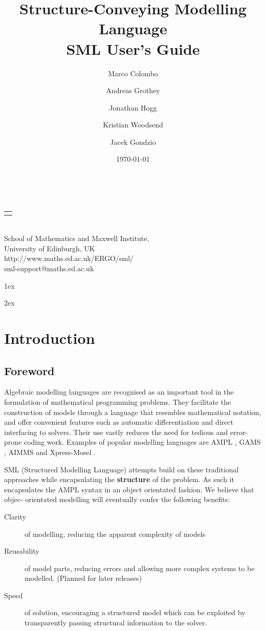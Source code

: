\documentclass[10pt,a4paper]{report}
\makeatletter
\renewcommand{\maketitle}{
\thispagestyle{empty}
\begin{center}
\vspace*{4cm}
{\rmfamily\Huge \@title}\\
\vspace{2cm}
{\rmfamily\Large
\begin{tabular}[t]{c}%
        \@author
      \end{tabular}
}\\
\vspace{1cm}
{\rmfamily\Large School of Mathematics and Maxwell Institute, \\[0.5ex]
University of Edinburgh, UK} \\[5ex]
{\ttfamily\Large http://www.maths.ed.ac.uk/ERGO/sml/ \\[0.5ex]
                 sml-support@maths.ed.ac.uk}\\
\vspace{2cm}
{\rmfamily \Large \@date}
\end{center}
\clearpage
}
\makeatother
\begin{document}
\title{Structure-Conveying Modelling Language \\[1em]
   \textbf{SML User's Guide}}
\author{Marco Colombo
  \and Andreas Grothey
  \and Jonathan Hogg
  \and Kristian Woodsend
  \and Jacek Gondzio}
\date{\today}

\maketitle

\parindent 0pt
\parskip   1ex

\tableofcontents

\parskip   2ex

\chapter*{Introduction}


\section*{Foreword}
\label{sec:Intro}

Algebraic modelling languages are recognised as an important tool in the
formulation of mathematical programming problems. They facilitate the
construction of models through a language that resembles mathematical
notation, and offer convenient features such as automatic differentiation and
direct interfacing to solvers. Their use vastly reduces the need for tedious
and error-prone coding work. Examples of popular modelling languages
are AMPL \cite{mybib:AMPL}, GAMS \cite{mybib:GAMS}, AIMMS \cite{mybib:AIMMS}
and Xpress-Mosel \cite{mybib:Mosel}.

SML (Structured Modelling Language) attempts build on these traditional
approaches while encapsulating the {\bf structure} of the problem. As such
it encapsulates the AMPL syntax in an object orientated fashion.
%
We believe that objec- orientated modelling will eventually confer the
following benefits:
\begin{description}
   \item[Clarity] of modelling, reducing the apparent complexity of models
   \item[Reusability] of model parts, reducing errors and allowing more complex
      systems to be modelled. (Planned for later releases)
   \item[Speed] of solution, encouraging a structured model which can be
      exploited by transparently passing structural information to the solver.
\end{description}
\end{document}

